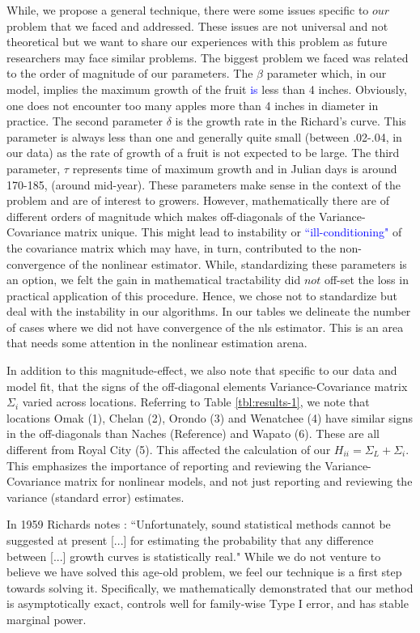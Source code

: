 \documentclass[useAMS]{cJAS2e}
\newcommand{\added}[1]{\textcolor{blue}{#1}}
\begin{document}
While, we propose a general technique, there were some issues specific to $our$ problem that we faced and addressed.  These issues are not universal and not theoretical but we want to share our experiences with this problem as future researchers may face similar problems.  The biggest problem we faced was related to the order of magnitude of our parameters.  The $\beta$ parameter which, in our model, implies the maximum growth of the fruit \added{is} less than 4 inches.  Obviously, one does not encounter too many apples more than 4 inches in diameter in practice.  The second parameter $\delta$ is the growth rate in the Richard's curve.  This parameter is always less than one and generally quite small (between .02-.04, in our data) as the rate of growth of a fruit is not expected to be large.  The third parameter, $\tau$ represents time of maximum growth and in Julian days is around 170-185, (around mid-year).  These parameters make sense in the context of the problem and are of interest to growers.  However, mathematically there are of different orders of magnitude which makes off-diagonals of the Variance-Covariance matrix unique.  This might lead to instability or \added{``ill-conditioning"} of the covariance matrix which may have, in turn, contributed to the non-convergence of the nonlinear estimator.  While, standardizing these parameters is an option, we felt the gain in mathematical tractability did $not$ off-set the loss in practical application of this procedure.  Hence, we chose not to standardize but deal with the instability in our algorithms.  In our tables we delineate the number of cases where we did not have convergence of the nls estimator.  This is an area that needs some attention in the nonlinear estimation arena.

In addition to this magnitude-effect, we also note that specific to our data and model fit, that the signs of the off-diagonal elements  Variance-Covariance matrix $\Sigma_i$ varied across locations.  Referring to Table \ref{tbl:results-1}, we note that locations Omak (1), Chelan (2), Orondo (3) and Wenatchee (4) have similar signs in the off-diagonals than Naches (Reference) and Wapato (6).  These are all different from Royal City (5).  This affected the calculation of our $H_{ii}=\Sigma_L+\Sigma_i$.  This emphasizes the importance of reporting and reviewing the Variance-Covariance matrix for nonlinear models, and not just reporting and reviewing the variance (standard error) estimates.

In 1959 Richards notes  \citep[p. 299]{Richards:1959}: ``Unfortunately, sound statistical methods cannot be suggested at present [...] for estimating the probability that any difference between [...] growth curves is statistically real."  While we do not venture to believe we have solved this age-old problem, we feel our technique is a first step towards solving it.  Specifically, we mathematically demonstrated that our method is asymptotically exact, controls well for family-wise Type I error, and has stable marginal power.
\end{document}
